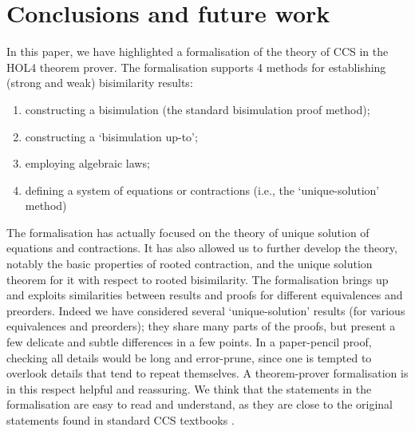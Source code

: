 
\section{Conclusions and future work}
\label{s:concl}

In this paper, we have highlighted a formalisation of the theory of CCS in the 
HOL4 theorem prover.
The formalisation supports 4 methods for establishing (strong and weak) bisimilarity
results: 
\begin{enumerate}
\item
 constructing a bisimulation (the standard bisimulation proof
method);
\item constructing a `bisimulation up-to'; 
\item employing algebraic laws;
\item defining a system of equations or contractions
(i.e., the `unique-solution' method)
\end{enumerate}

The formalisation has actually focused on the theory of
unique solution of equations and contractions. It    
 has also allowed us to further develop the theory,
notably the basic properties of rooted contraction, and the unique
solution theorem for it with respect to rooted bisimilarity. 
The formalisation brings up and exploits similarities between results
and proofs for different equivalences and preorders. Indeed we have
considered several `unique-solution' results (for various equivalences
and preorders); they share many parts of the proofs, but present a few
delicate and subtle differences in a few points. In a paper-pencil
proof, checking all details would be long and error-prune, since one
is tempted to overlook  details that tend to repeat themselves. 
A theorem-prover formalisation is in this respect  helpful and reassuring.
We think that the statements in the formalisation are easy to read and
understand, as they are  close to the original statements found in
standard CCS textbooks \cite{Gorrieri:2015jt,Mil89}.

